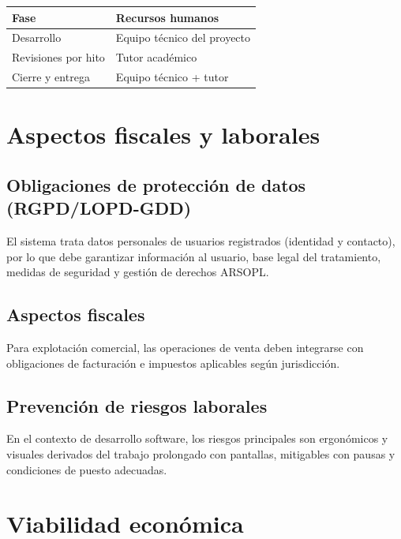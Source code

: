 \documentclass[
  11pt,
  a4paper,
  twoside=false,
  parskip=half               %
]{scrreprt}                  %
\begin{document}
\begin{longtable}[]{@{}ll@{}}
\toprule\noalign{}
Fase & Recursos humanos \\
\midrule\noalign{}
\endhead
\bottomrule\noalign{}
\endlastfoot
Desarrollo & Equipo técnico del proyecto \\
Revisiones por hito & Tutor académico \\
Cierre y entrega & Equipo técnico + tutor \\
\end{longtable}

\hypertarget{aspectos-fiscales-y-laborales}{%
\section{Aspectos fiscales y
laborales}\label{aspectos-fiscales-y-laborales}}

\hypertarget{obligaciones-de-protecciuxf3n-de-datos-rgpdlopd-gdd}{%
\subsection{Obligaciones de protección de datos
(RGPD/LOPD-GDD)}\label{obligaciones-de-protecciuxf3n-de-datos-rgpdlopd-gdd}}

El sistema trata datos personales de usuarios registrados (identidad y
contacto), por lo que debe garantizar información al usuario, base legal
del tratamiento, medidas de seguridad y gestión de derechos ARSOPL.

\hypertarget{aspectos-fiscales}{%
\subsection{Aspectos fiscales}\label{aspectos-fiscales}}

Para explotación comercial, las operaciones de venta deben integrarse
con obligaciones de facturación e impuestos aplicables según
jurisdicción.

\hypertarget{prevenciuxf3n-de-riesgos-laborales}{%
\subsection{Prevención de riesgos
laborales}\label{prevenciuxf3n-de-riesgos-laborales}}

En el contexto de desarrollo software, los riesgos principales son
ergonómicos y visuales derivados del trabajo prolongado con pantallas,
mitigables con pausas y condiciones de puesto adecuadas.

\hypertarget{viabilidad-econuxf3mica}{%
\section{Viabilidad económica}\label{viabilidad-econuxf3mica}}
\end{document}
